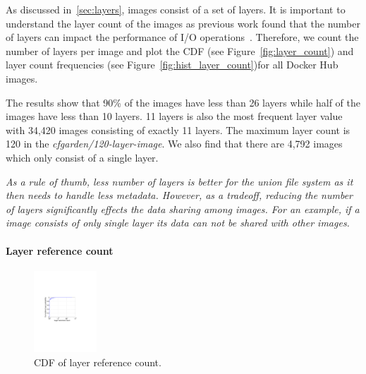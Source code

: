 As discussed in~\ref{sec:layers}, images consist of a set of layers.
It is important to understand the layer count of the images as previous
work found that the number of layers can impact the performance of
I/O operations~\cite{slacker}. Therefore, we count the number of layers
per image and plot the CDF (see Figure~\ref{fig:layer_count})
and layer count frequencies (see Figure~\ref{fig:hist_layer_count})for all
Docker Hub images.

The results show that 90\% of the images have less than 26 layers while
half of the images have less than 10 layers. 11 layers is also the most
frequent layer value with 34,420 images consisting of exactly 11 layers.
The maximum layer count is 120 in the \textit{cfgarden/120-layer-image}.
We also find that there are 4,792 images which only consist of a single layer.

\emph{As a rule of thumb, less number of layers is better for the union file
	system as it then needs to handle less metadata. However, as a tradeoff,
	reducing the number of layers significantly effects the data sharing among images.
	For an example, if a image consists of only single layer its data can not be shared
	with other images.}
%

\paragraph{Layer reference count}

\begin{figure}
	\centering
	\includegraphics[width=0.21\textwidth]{graphs/shared-cnt-cdf.pdf}
	\caption{CDF of layer reference count.
	}
	\label{fig:ref_count}
\end{figure}

